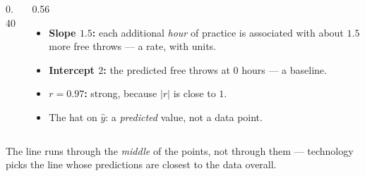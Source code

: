 \documentclass[aspectratio=169, 11pt]{beamer}
\newcommand{\lgrid}[4]{%
  \draw[step=1, linegray!40, very thin] (#1,#3) grid (#2,#4);
  \draw[->, thick, charcoal] (#1,0)--(#2,0) node[below right, font=\tiny]{$x$};
  \draw[->, thick, charcoal] (0,#3)--(0,#4) node[left, font=\tiny]{$y$};}
\newcommand{\dpt}[2]{\fill[navy] (#1,#2) circle (2.8pt);}
\newcommand{\ftdata}{\dpt{1}{4}\dpt{2}{4}\dpt{3}{7}\dpt{4}{7}\dpt{5}{11}\dpt{6}{11}\dpt{7}{12}\dpt{8}{14}}
\begin{document}
\begin{frame}[t, plain]
  \begin{columns}[T]
    \begin{column}{0.40\textwidth}
      \centering
    \end{column}
    \begin{column}{0.56\textwidth}
      \begin{itemize}\setlength{\itemsep}{5pt}
        \item \textbf{Slope $1.5$:} each additional \emph{hour} of practice is associated with
              about $1.5$ more free throws --- a rate, with units.
        \item \textbf{Intercept $2$:} the predicted free throws at $0$ hours --- a baseline.
        \item \textbf{$r=0.97$:} strong, because $|r|$ is close to $1$.
        \item The hat on $\hat y$: a \emph{predicted} value, not a data point.
      \end{itemize}
    \end{column}
  \end{columns}
  \vspace{4pt}
  The line runs through the \emph{middle} of the points, not through them --- technology picks the
  line whose predictions are closest to the data overall.
\end{frame}
\end{document}
